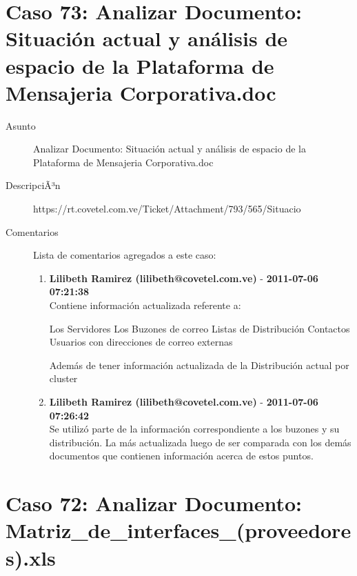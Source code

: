 \section{Caso 73: Analizar Documento: Situación actual y análisis de espacio de la Plataforma de Mensajeria Corporativa.doc }

\begin{description}

\item[Asunto] Analizar Documento: Situación actual y análisis de espacio de la Plataforma de Mensajeria Corporativa.doc\item[DescripciÃ³n] https://rt.covetel.com.ve/Ticket/Attachment/793/565/Situacio%

\item[Comentarios] Lista de comentarios agregados a este caso:  
\begin{enumerate}
        \item {\bfseries Lilibeth Ramirez (lilibeth@covetel.com.ve)  } - {\bfseries 2011-07-06 07:21:38} \\ Contiene información actualizada referente a:

Los Servidores
Los Buzones de correo
Listas de Distribución
Contactos
Usuarios con direcciones de correo externas

Además de tener información actualizada de la Distribución actual por cluster        \item {\bfseries Lilibeth Ramirez (lilibeth@covetel.com.ve)  } - {\bfseries 2011-07-06 07:26:42} \\ Se utilizó parte de la información correspondiente a los buzones y su
distribución. La más actualizada luego de ser comparada con los demás
documentos que contienen información acerca de estos puntos.    \end{enumerate}

\end{description}

\section{Caso 72: Analizar Documento: Matriz_de_interfaces_(proveedores).xls }

